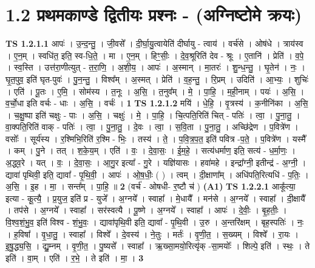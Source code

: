 \documentclass[17pt]{extarticle}
\begin{document}
\section*{ 1.2     प्रथमकाण्डे द्वितीयः प्रश्नः - (अग्निष्टोमे क्रयः) }
                                \textbf{ TS 1.2.1.1} \newline
                  आपः॑ । उ॒न्द॒न्तु॒ । जी॒वसे᳚ । दी॒र्घा॒यु॒त्वायेति॑ दीर्घायु - त्वाय॑ । वर्च॑से । ओष॑धे । त्राय॑स्व । ए॒न॒म् । स्वधि॑त॒ इति॒ स्व-धि॒ते॒ । मा । ए॒न॒म् । हिꣳ॒॒सीः॒ । दे॒व॒श्रूरिति॑ देव - श्रूः । ए॒तानि॑ । प्रेति॑ । व॒पे॒ । स्व॒स्ति । उत्त॑रा॒णीत्युत् - त॒रा॒णि॒ । अ॒शी॒य॒ । आपः॑ । अ॒स्मान् । मा॒तरः॑ । शु॒न्ध॒न्तु॒ । घृ॒तेन॑ । नः॒ । घृ॒त॒पुव॒ इति॑ घृत-पुवः॑ । पु॒न॒न्तु॒ । विश्व᳚म् । अ॒स्मत् । प्रेति॑ । व॒ह॒न्तु॒ । रि॒प्रम् । उदिति॑ । आ॒भ्यः॒ । शुचिः॑ । एति॑ । पू॒तः । ए॒मि॒ । सोम॑स्य । त॒नूः । अ॒सि॒ । त॒नुव᳚म् । मे॒ । पा॒हि॒ । म॒ही॒नाम् । पयः॑ । अ॒सि॒ । व॒र्चो॒धा इति वर्चः - धाः । अ॒सि॒ । वर्चः॑ । \textbf{  1} \newline
                  \newline
                                \textbf{ TS 1.2.1.2} \newline
                  मयि॑ । धे॒हि॒ । वृ॒त्रस्य॑ । क॒नीनि॑का । अ॒सि॒ । च॒क्षु॒ष्पा इति॑ चक्षुः - पाः । अ॒सि॒ । चक्षुः॑ । मे॒ । पा॒हि॒ । चि॒त्पति॒रिति॑ चित् - पतिः॑ । त्वा॒ । पु॒ना॒तु॒ । वा॒क्पति॒रिति॑ वाक् - पतिः॑ । त्वा॒ । पु॒ना॒तु॒ । दे॒वः । त्वा॒ । स॒वि॒ता । पु॒ना॒तु॒ । अच्छि॑द्रेण । प॒वित्रे॑ण । वसोः᳚ । सूर्य॑स्य । र॒श्मिभि॒रिति॑ र॒श्मि - भिः॒ । तस्य॑ । ते॒ । प॒वि॒त्र॒प॒त॒ इति॑ पवित्र -प॒ते॒ । प॒वित्रे॑ण । यस्मै᳚ । कम् । पु॒ने । तत् । श॒के॒य॒म् । एति॑ । वः॒ । दे॒वा॒सः॒ । ई॒म॒हे॒ । सत्य॑धर्माण॒ इति॒ सत्य॑ - ध॒र्मा॒णः॒ । अ॒द्ध्व॒रे । यत् । वः॒ । दे॒वा॒सः॒ । आ॒गु॒र इत्या᳚ - गु॒रे । यज्ञि॑यासः । हवा॑महे । इन्द्रा᳚ग्नी॒ इतीन्द्र॑ - अ॒ग्नी॒ । द्यावा॑ पृथिवी॒ इति॒ द्यावा᳚ - पृ॒थि॒वी॒ । आपः॑ । ओ॒ष॒धीः॒ ( ) । त्वम् । दी॒क्षाणा᳚म् । अधि॑पति॒रित्यधि॑ - प॒तिः॒ । अ॒सि॒ । इ॒ह । मा॒ । सन्त᳚म् । पा॒हि॒ ॥ \textbf{  2 } \newline
                  \newline
                      (वर्च॑ - ओषधी- र॒ष्टौ च॑ )  \textbf{(A1)} \newline \newline
                                \textbf{ TS 1.2.2.1} \newline
                  आकू᳚त्या॒ इत्या - कू॒त्यै॒ । प्र॒युज॒ इति॑ प्र - युजे᳚ । अ॒ग्नये᳚ । स्वाहा᳚ । मे॒धायै᳚ । मन॑से । अ॒ग्नये᳚ । स्वाहा᳚ । दी॒क्षायै᳚ । तप॑से । अ॒ग्नये᳚ । स्वाहा᳚ । सर॑स्वत्यै । पू॒ष्णे । अ॒ग्नये᳚ । स्वाहा᳚ । आपः॑ । दे॒वीः॒ । बृ॒ह॒तीः॒ । वि॒श्व॒शं॒भु॒व॒ इति॑ विश्व - शं॒भु॒वः॒ । द्यावा॑पृथि॒वी इति॒ द्यावा᳚ - पृ॒थि॒वी । उ॒रु । अ॒न्तरि॑क्षम् । बृह॒स्पतिः॑ । नः॒ । ह॒विषा᳚ । वृ॒धा॒तु॒ । स्वाहा᳚ । विश्वे᳚ । दे॒वस्य॑ । ने॒तुः । मर्तः॑ । वृ॒णी॒त॒ । स॒ख्यम् । विश्वे᳚ । रा॒यः । इ॒षु॒द्ध्य॒सि॒ । द्यु॒म्नम् । वृ॒णी॒त॒ । पु॒ष्यसे᳚ । स्वाहा᳚ । ऋ॒ख्सा॒मयो॒रित्यृ॑क् -सा॒मयोः᳚ । शिल्पे॒ इति॑ । स्थः॒ । ते इति॑ । वा॒म् । एति॑ । र॒भे॒ । ते इति॑ । मा॒ । \textbf{  3} \newline
\end{document}
